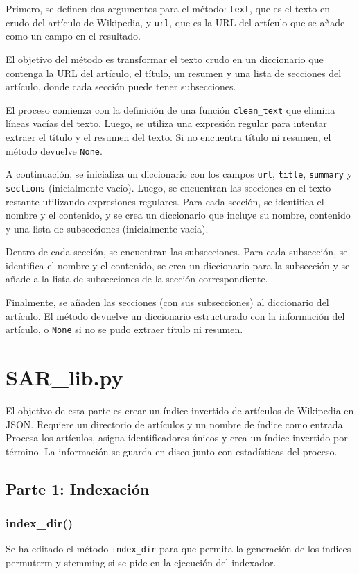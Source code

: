 \documentclass[12pt,a4paper]{article}
\begin{document}
Primero, se definen dos argumentos para el método: \texttt{text}, que es el texto en crudo del artículo de Wikipedia, y \texttt{url}, que es la URL del artículo que se añade como un campo en el resultado.

El objetivo del método es transformar el texto crudo en un diccionario que contenga la URL del artículo, el título, un resumen y una lista de secciones del artículo, donde cada sección puede tener subsecciones.

El proceso comienza con la definición de una función \texttt{clean\_text} que elimina líneas vacías del texto. Luego, se utiliza una expresión regular para intentar extraer el título y el resumen del texto. Si no encuentra título ni resumen, el método devuelve \texttt{None}.

A continuación, se inicializa un diccionario con los campos \texttt{url}, \texttt{title}, \texttt{summary} y \texttt{sections} (inicialmente vacío). Luego, se encuentran las secciones en el texto restante utilizando expresiones regulares. Para cada sección, se identifica el nombre y el contenido, y se crea un diccionario que incluye su nombre, contenido y una lista de subsecciones (inicialmente vacía).

Dentro de cada sección, se encuentran las subsecciones. Para cada subsección, se identifica el nombre y el contenido, se crea un diccionario para la subsección y se añade a la lista de subsecciones de la sección correspondiente.

Finalmente, se añaden las secciones (con sus subsecciones) al diccionario del artículo. El método devuelve un diccionario estructurado con la información del artículo, o \texttt{None} si no se pudo extraer título ni resumen.

\section{SAR\_lib.py}

El objetivo de esta parte es crear un índice invertido de artículos de Wikipedia en JSON. Requiere un directorio de artículos y un nombre de índice como entrada. Procesa los artículos, asigna identificadores únicos y crea un índice invertido por término. La información se guarda en disco junto con estadísticas del proceso.

\subsection{Parte 1: Indexación}
\subsubsection{index\_dir()}
Se ha editado el método \texttt{index\_dir} para que permita la generación de los índices permuterm y stemming si se pide en la ejecución del indexador.
\end{document}
